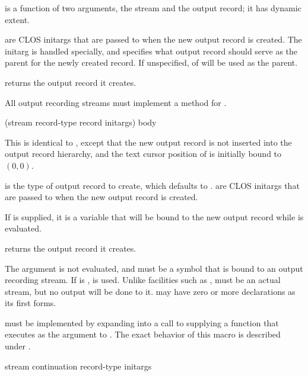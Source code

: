  is a function of two arguments, the stream and the output
record; it has dynamic extent.

 are CLOS initargs that are passed to  when the
new output record is created.  The  initarg is handled specially,
and specifies what output record should serve as the parent for the newly
created record.  If unspecified,  of
 will be used as the parent.

 returns the output record it creates.

All output recording streams must implement a method for
.


 {(stream \optional record-type record
                                           \rest initargs)
                                          \body body}

This is identical to , except that the new output record
is not inserted into the output record hierarchy, and the text cursor position
of  is initially bound to $(0,0)$.

 is the type of output record to create, which defaults to
.   are CLOS initargs that are
passed to  when the new output record is created.

If  is supplied, it is a variable that will be bound to the new
output record while  is evaluated.

 returns the output record it creates.

The  argument is not evaluated, and must be a symbol that is bound to
an output recording stream.  If  is ,  is
used.  Unlike facilities such as ,  must be
an actual stream, but no output will be done to it.   may have zero or
more declarations as its first forms.

 must be implemented by expanding into a call
to  supplying a function that executes
 as the  argument to
.  The exact behavior of this macro is
described under .

 {stream continuation record-type 
                                                   \rest initargs \key}

